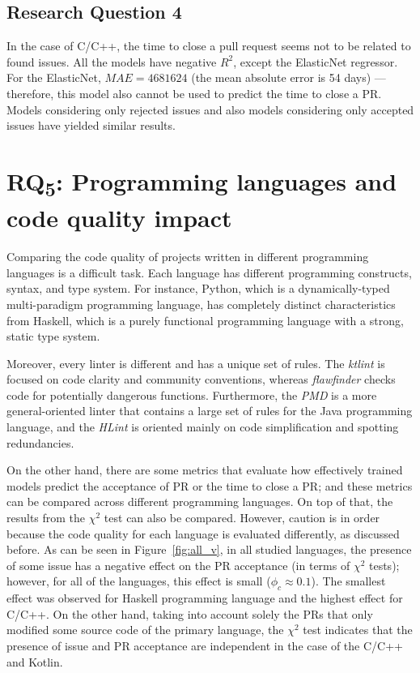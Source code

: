 \documentclass[digital,oneside,oldtable,nolof,nolot,nocover]{fithesis4}
\begin{document}
\subsection{Research Question 4}
\label{sec:org729019d}
In the case of C/C++, the time to close a pull request seems not to be related
to found issues.  All the models have negative \(R^2\), except the ElasticNet
regressor. For the ElasticNet, \(MAE = 4681624\) (the mean absolute error is 54
days) --- therefore, this model also cannot be used to predict the time to
close a PR.  Models considering only rejected issues and also models
considering only accepted issues have yielded similar results.
\FloatBarrier
\section{RQ\textsubscript{5}: Programming languages and code quality impact}
\label{sec:orgfcbf353}
Comparing the code quality of projects written in different programming
languages is a difficult task.  Each language has different programming
constructs, syntax, and type system. For instance, Python, which is
a dynamically-typed multi-paradigm programming language, has completely
distinct characteristics from Haskell, which is a purely functional programming
language with a strong, static type system.

Moreover, every linter is different and has a unique set of rules.  The
\emph{ktlint} is focused on code clarity and community conventions, whereas
\emph{flawfinder} checks code for potentially dangerous functions. Furthermore,
the \emph{PMD} is a more general-oriented linter that contains a large set of
rules for the Java programming language, and the \emph{HLint} is oriented mainly
on code simplification and spotting redundancies.

On the other hand, there are some metrics that evaluate how effectively
trained models predict the acceptance of PR or the time to close a PR;
and these metrics can be compared across different programming languages.
On top of that, the results from the \(\chi^2\) test can also be compared.
However, caution is in order because the code quality for each language is
evaluated differently, as discussed before.
As can be seen in Figure~\ref{fig:all_v}, in all studied languages, the
presence of some issue has a negative effect on the PR acceptance (in terms
of \(\chi^2\) tests); however, for all of the languages, this effect is small (\(\phi_c
   \approx 0.1\)).  The smallest effect was observed for Haskell programming
language and the highest effect for C/C++.  On the other hand,
taking into account solely the PRs that only modified some source code of the
primary language, the \(\chi^2\) test indicates that the presence of issue and PR
acceptance are independent in the case of the C/C++ and Kotlin.
\end{document}
